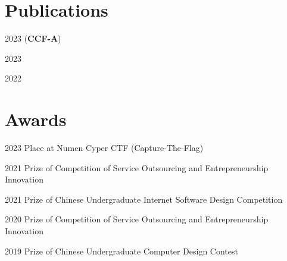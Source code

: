 \documentclass[12pt,letterpaper]{report}
\begin{document}
    \section*{Publications}
    \begin{tablist}
        \item[2023] \tab{} (\textbf{CCF-A})
        \item[2023] \tab{}
        \item[2022] \tab{}
    \end{tablist}


    \section*{Awards}
    \begin{tablist}
        \item[2023] \tab{} Place at Numen Cyper CTF (Capture-The-Flag)
        \item[2021] \tab{} Prize of Competition of Service Outsourcing and Entrepreneurship Innovation
        \item[2021] \tab{} Prize of Chinese Undergraduate Internet Software Design Competition
        \item[2020] \tab{} Prize of Competition of Service Outsourcing and Entrepreneurship Innovation
        \item[2019] \tab{} Prize of Chinese Undergraduate Computer Design Contest
    \end{tablist}
\end{document}
